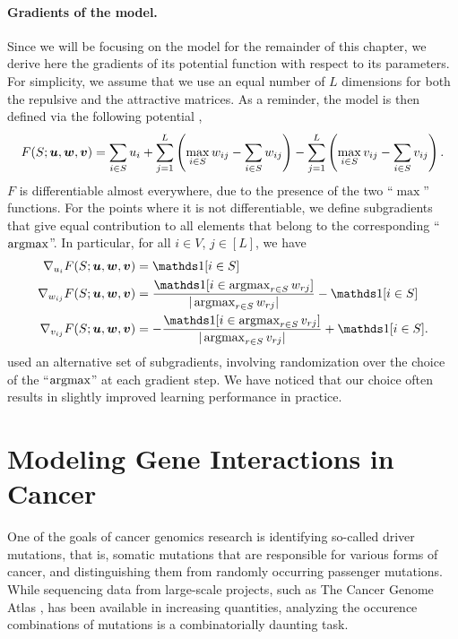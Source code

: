\paragraph{Gradients of the \fldc{} model.}
Since we will be focusing on the \fldc{} model for the remainder of this chapter, we derive here the gradients of its potential function with respect to its parameters.
For simplicity, we assume that we use an equal number of $L$ dimensions for both the repulsive and the attractive matrices.
As a reminder, the \fldc{} model is then defined via the following potential \citep{djolonga16mixed},
\begin{align*}
F(S; \bm{u}, \bm{w}, \bm{v}) = \sum_{i \in S} u_i + \sum_{j=1}^{L} \left(\max_{i \in S} w_{ij} - \sum_{i \in S} w_{ij}\right) - \sum_{j=1}^{L} \left(\max_{i \in S} v_{ij} - \sum_{i \in S} v_{ij}\right).
\end{align*}
$F$ is differentiable almost everywhere, due to the presence of the two ``$\max$'' functions.
For the points where it is not differentiable, we define subgradients that give equal contribution to all elements that belong to the corresponding ``$\argmax$''.
In particular, for all $i \in V$, $j \in [L]$, we have
\begin{align*}
\nabla_{u_i} F(S; \bu, \bw, \bv) &= \ind[i \in S]\\
\nabla_{w_{ij}} F(S; \bu, \bw, \bv) &= \frac{\ind[i \in \argmax_{r \in S} w_{rj}]}{|\argmax_{r \in S} w_{rj}|} - \ind[i \in S]\\
\nabla_{v_{ij}} F(S; \bu, \bw, \bv) &= -\frac{\ind[i \in \argmax_{r \in S} v_{rj}]}{|\argmax_{r \in S} v_{rj}|} + \ind[i \in S].
\end{align*}
\citet{tschiatschek16} used an alternative set of subgradients, involving randomization over the choice of the ``$\argmax$'' at each gradient step.
We have noticed that our choice often results in slightly improved learning performance in practice.


\section{Modeling Gene Interactions in Cancer}
One of the goals of cancer genomics research is identifying so-called driver mutations, that is, somatic mutations that are responsible for various forms of cancer, and distinguishing them from randomly occurring passenger mutations.
While sequencing data from large-scale projects, such as The Cancer Genome Atlas \citep{tcga}, has been available in increasing quantities, analyzing the occurence combinations of mutations is a combinatorially daunting task.

